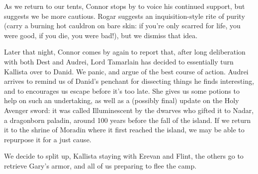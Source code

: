 \documentclass[letterpaper]{article}
\begin{document}
As we return to our tents, Connor stops by to voice his continued support, but suggests we be more cautious. Rogar suggests an inquisition-style rite of purity (carry a burning hot cauldron on bare skin: if you're only scarred for life, you were good, if you die, you were bad!), but we dismiss that idea.

Later that night, Connor comes by again to report that, after long deliberation with both Dest and Audrei, Lord Tamarlain has decided to essentially turn Kallista over to Danid. We panic, and argue of the best course of action. Audrei arrives to remind us of Danid's penchant for dissecting things he finds interesting, and to encourages us escape before it's too late. She gives us some potions to help on such an undertaking, as well as a (possibly final) update on the Holy Avenger sword: it was called Illuminescent by the dwarves who gifted it to Nadar, a dragonborn paladin, around 100 years before the fall of the island. If we return it to the shrine of Moradin where it first reached the island, we may be able to repurpose it for a just cause.

We decide to split up, Kallista staying with Erevan and Flint, the others go to retrieve Gary's armor, and all of us preparing to flee the camp.
\end{document}
